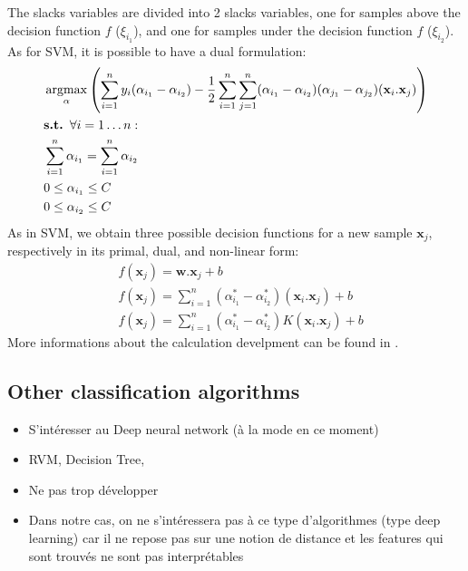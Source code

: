 \noindent The slacks variables are divided into 2 slacks variables, one for samples above the decision function $f$ ($\xi_{i_1}$), and one for samples under the decision function $f$ ($\xi_{i_2}$). As for SVM, it is possible to have a dual formulation:
	\begin{align}
		& \argmax_{\alpha} 
		\left( 
		\sum\limits_{i=1}^{n} y_i(\alpha_{i_1}-\alpha_{i_2})
		-\frac{1}{2} \sum\limits_{i=1}^{n} \sum\limits_{j=1}^{n} (\alpha_{i_1}-\alpha_{i_2})(\alpha_{j_1}-\alpha_{j_2}) (\textbf{x}_i.\textbf{x}_j)
		\right) \\ 
		& \textbf{s.t. } \forall i=1 \ldots n:\\
		& \sum\limits_{i=1}^{n} \alpha_{i_1} = \sum\limits_{i=1}^{n} \alpha_{i_2} \\
		& 0 \leq \alpha_{i_1} \leq C \\
		& 0 \leq \alpha_{i_2} \leq C
	\end{align}
\noindent As in SVM, we obtain three possible decision functions for a new sample $\textbf{x}_j$, respectively in its primal, dual, and non-linear form:
\begin{align}
	& f(\textbf{x}_j) = \textbf{w}.\textbf{x}_j+b \\ 
	& f(\textbf{x}_j) = \sum\limits_{i=1}^{n} (\alpha_{i_1}^*-\alpha_{i_2}^*)(\textbf{x}_i.\textbf{x}_j) + b \\	
	& f(\textbf{x}_j) = \sum\limits_{i=1}^{n} (\alpha_{i_1}^*-\alpha_{i_2}^*)K(\textbf{x}_i.\textbf{x}_j) + b
\end{align}	
More informations about the calculation develpment can be found in \cite{Bishop2006}.
\subsection{Other classification algorithms}
\begin{itemize}
	\item S'intéresser au Deep neural network (à la mode en ce moment)
	\item RVM, Decision Tree, 
	\item Ne pas trop développer
	\item Dans notre cas, on ne s'intéressera pas à ce type d'algorithmes (type deep learning) car il ne repose pas sur une notion de distance et les features qui sont trouvés ne sont pas interprétables
\end{itemize}




